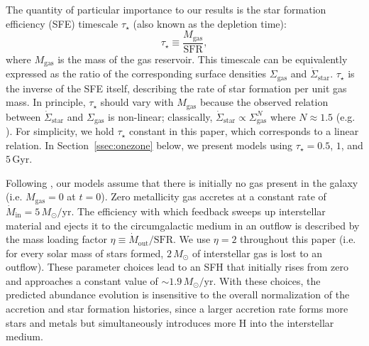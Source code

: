 \documentclass[twocolumn]{aastex631}
\newcommand{\Msun}{\ensuremath{M_{\odot}}}
\newcommand{\Gyr}{\ensuremath{\textrm{Gyr}}}
\newcommand{\Msunyr}{\ensuremath{\Msun/\textrm{yr}}}
\newcommand{\SFR}{\ensuremath{\textrm{SFR}}}
\begin{document}
The quantity of particular importance to our results is the star formation efficiency (SFE) timescale $\tau_\star$ (also known as the depletion time):
\begin{equation}
\tau_\star \equiv \frac{M_{\textrm{gas}}}{\SFR},
\end{equation}
where $M_{\textrm{gas}}$ is the mass of the gas reservoir. This timescale can be equivalently expressed as the ratio of the corresponding surface densities $\Sigma_{\textrm{gas}}$ and $\dot{\Sigma}_{\textrm{star}}$. $\tau_\star$ is the inverse of the SFE itself, describing the rate of star formation per unit gas mass. In principle, $\tau_\star$ should vary with $M_{\textrm{gas}}$ because the observed relation between $\dot{\Sigma}_{\textrm{star}}$ and $\Sigma_{\textrm{gas}}$ is non-linear; classically, $\dot{\Sigma}_{\textrm{star}} \propto \Sigma_{\textrm{gas}}^N$ where $N \approx 1.5$ (e.g. \citealt{Schmidt1959, Kennicutt1998}). For simplicity, we hold $\tau_\star$ constant in this paper, which corresponds to a linear relation. In Section~\ref{ssec:onezone} below, we present models using $\tau_\star = 0.5$, $1$, and $5\,\Gyr$.

Following \citet{2022arXiv220402989C}, our models assume that there is initially no gas present in the galaxy (i.e. $M_{\textrm{gas}} = 0$ at $t = 0$). Zero metallicity gas accretes at a constant rate of $\dot{M}_\text{in} = 5\,\Msunyr$. The efficiency with which feedback sweeps up interstellar material and ejects it to the circumgalactic medium in an outflow is described by the mass loading factor $\eta \equiv \dot{M}_\text{out} / \SFR$. We use $\eta = 2$ throughout this paper (i.e. for every solar mass of stars formed, $2\,\Msun$ of interstellar gas is lost to an outflow). These parameter choices lead to an SFH that initially rises from zero and approaches a constant value of $\sim1.9\,\Msunyr$. With these choices, the predicted abundance evolution is insensitive to the overall normalization of the accretion and star formation histories, since a larger accretion rate forms more stars and metals but simultaneously introduces more H into the interstellar medium.
\end{document}
